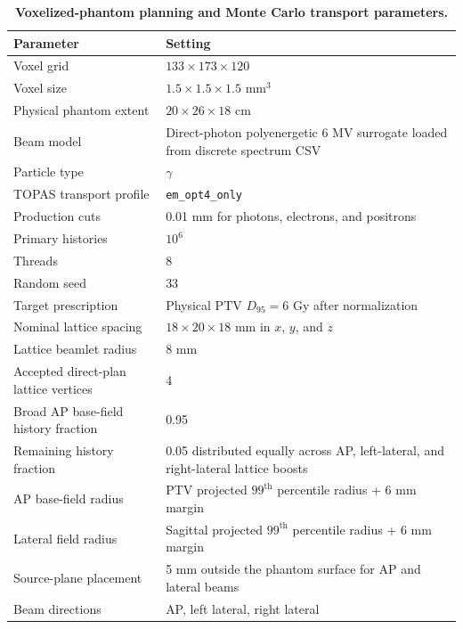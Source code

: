 \begin{table}[H]
\centering
\caption{\textbf{Voxelized-phantom planning and Monte Carlo transport parameters.}}
\label{tab:planning_transport_parameters}
\small
\begin{tabular}{p{5.4cm}p{7.2cm}}
\toprule
Parameter & Setting \\
\midrule
Voxel grid & $133 \times 173 \times 120$ \\
Voxel size & $1.5 \times 1.5 \times 1.5$ mm$^3$ \\
Physical phantom extent & $20 \times 26 \times 18$ cm \\
Beam model & Direct-photon polyenergetic 6 MV surrogate loaded from discrete spectrum CSV \\
Particle type & $\gamma$ \\
TOPAS transport profile & \texttt{em\_opt4\_only} \\
Production cuts & 0.01 mm for photons, electrons, and positrons \\
Primary histories & $10^6$ \\
Threads & 8 \\
Random seed & 33 \\
Target prescription & Physical PTV $D_{95} = 6$ Gy after normalization \\
Nominal lattice spacing & $18 \times 20 \times 18$ mm in $x$, $y$, and $z$ \\
Lattice beamlet radius & 8 mm \\
Accepted direct-plan lattice vertices & 4 \\
Broad AP base-field history fraction & 0.95 \\
Remaining history fraction & 0.05 distributed equally across AP, left-lateral, and right-lateral lattice boosts \\
AP base-field radius & PTV projected $99^\mathrm{th}$ percentile radius + 6 mm margin \\
Lateral field radius & Sagittal projected $99^\mathrm{th}$ percentile radius + 6 mm margin \\
Source-plane placement & 5 mm outside the phantom surface for AP and lateral beams \\
Beam directions & AP, left lateral, right lateral \\
\bottomrule
\end{tabular}
\end{table}
